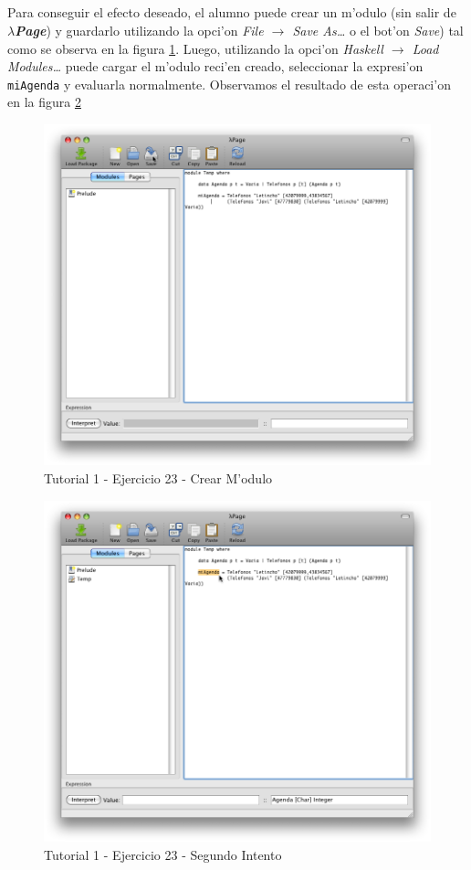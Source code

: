 \documentclass[a4paper]{article}
\newcommand{\hpage}{\textbf{\textsl{$\lambda$Page}}}
\begin{document}
\subparagraph{}Para conseguir el efecto deseado, el alumno puede crear un m'odulo (sin salir de \hpage) y guardarlo utilizando la opci'on \textsl{File $\rightarrow$ Save As\ldots} o el bot'on \textsl{Save}) tal como se observa en la figura \ref{tut110}.  Luego, utilizando la opci'on \textsl{Haskell $\rightarrow$ Load Modules\ldots} puede cargar el m'odulo reci'en creado, seleccionar la expresi'on \texttt{miAgenda} y evaluarla normalmente.  Observamos el resultado de esta operaci'on en la figura \ref{tut111}
\begin{figure}[hp]
	\begin{center}
        	\includegraphics[width=.9\textwidth]{pictures/tut1/10}
		\caption{Tutorial 1 - Ejercicio 23 - Crear M'odulo}
		\label{tut110}
	\end{center}
\end{figure}
\begin{figure}[hp]
	\begin{center}
        	\includegraphics[width=.9\textwidth]{pictures/tut1/11}
		\caption{Tutorial 1 - Ejercicio 23 - Segundo Intento}
		\label{tut111}
	\end{center}
\end{figure}
\end{document}
